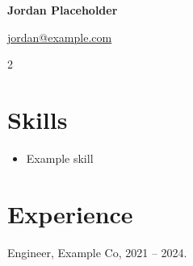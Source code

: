 \documentclass[11pt,a4paper]{article}
\begin{document}
{\LARGE\bfseries Jordan Placeholder}\par
\href{mailto:jordan@example.com}{jordan@example.com}
\begin{multicols}{2}
\section*{Skills}
\begin{itemize}[leftmargin=*]
\item Example skill
\end{itemize}
\columnbreak
\section*{Experience}
Engineer, Example Co, 2021 -- 2024.
\end{multicols}
\end{document}
